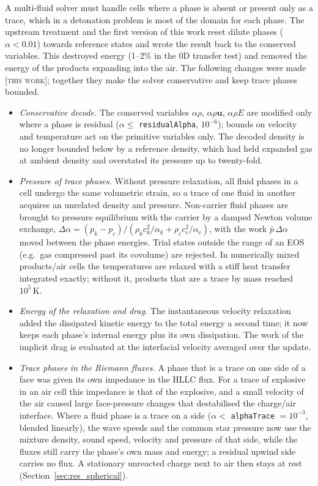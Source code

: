 \documentclass{article}
\newcommand{\tw}{\textsc{[this work]}}
\begin{document}
A multi-fluid solver must handle cells where a phase is absent or present only as a trace, which in a detonation problem is most of the domain for each phase. The upstream treatment and the first version of this work reset dilute phases ($\alpha < 0.01$) towards reference states and wrote the result back to the conserved variables. This destroyed energy (1--2\% in the 0D transfer test) and removed the energy of the products expanding into the air. The following changes were made \tw; together they make the solver conservative and keep trace phases bounded.

\begin{itemize}
    \item \emph{Conservative decode.} The conserved variables $\alpha\rho$, $\alpha\rho\mathbf{u}$, $\alpha\rho E$ are modified only where a phase is residual ($\alpha \le$ \texttt{residualAlpha}, $10^{-6}$); bounds on velocity and temperature act on the primitive variables only. The decoded density is no longer bounded below by a reference density, which had held expanded gas at ambient density and overstated its pressure up to twenty-fold.
    \item \emph{Pressure of trace phases.} Without pressure relaxation, all fluid phases in a cell undergo the same volumetric strain, so a trace of one fluid in another acquires an unrelated density and pressure. Non-carrier fluid phases are brought to pressure equilibrium with the carrier by a damped Newton volume exchange, $\Delta\alpha = (p_k - p_c)/(\rho_k c_k^2/\alpha_k + \rho_c c_c^2/\alpha_c)$, with the work $\bar p\,\Delta\alpha$ moved between the phase energies. Trial states outside the range of an EOS (e.g.\ gas compressed past its covolume) are rejected. In numerically mixed products/air cells the temperatures are relaxed with a stiff heat transfer integrated exactly; without it, products that are a trace by mass reached $10^5\,\text{K}$.
    \item \emph{Energy of the relaxation and drag.} The instantaneous velocity relaxation added the dissipated kinetic energy to the total energy a second time; it now keeps each phase's internal energy plus its own dissipation. The work of the implicit drag is evaluated at the interfacial velocity averaged over the update.
    \item \emph{Trace phases in the Riemann fluxes.} A phase that is a trace on one side of a face was given its own impedance in the HLLC flux. For a trace of explosive in an air cell this impedance is that of the explosive, and a small velocity of the air caused large face-pressure changes that destabilised the charge/air interface. Where a fluid phase is a trace on a side ($\alpha <$ \texttt{alphaTrace} $= 10^{-3}$, blended linearly), the wave speeds and the common star pressure now use the mixture density, sound speed, velocity and pressure of that side, while the fluxes still carry the phase's own mass and energy; a residual upwind side carries no flux. A stationary unreacted charge next to air then stays at rest (Section~\ref{sec:res_spherical}).

\end{itemize}
\end{document}
